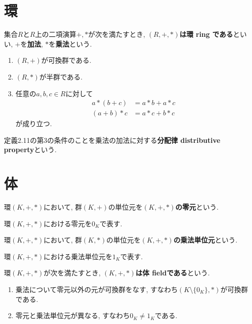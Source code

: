 \section{環}
\begin{Def}
集合$R$と$R$上の二項演算$+,*$が次を満たすとき, {\bf $(R,+,*)$は環 ring である}といい, $+$を{\bf 加法}, $*$を{\bf 乗法}という. 
\begin{enumerate}
\item $(R,+)$が可換群である.
\item $(R,*)$が半群である.
\item 任意の$a,b,c\in R$に対して
\begin{align*}
a*(b+c)&=a*b+a*c\\
(a+b)*c&=a*c+b*c
\end{align*}
が成り立つ.
\end{enumerate}
\end{Def}
\begin{caution}
定義2.11の第3の条件のことを乗法の加法に対する{\bf 分配律 distributive property}という.
\end{caution}
\section{体}
\begin{Def}
環$(K,+,*)$において,
群$(K,+)$の単位元を{\bf $(K,+,*)$の零元}という.
\end{Def}
\begin{Notation}
環$(K,+,*)$における零元を$0_K$で表す.
\end{Notation}
\begin{Def}
環$(K,+,*)$において,
群$(K,*)$の単位元を{\bf $(K,+,*)$の乗法単位元}という.
\end{Def}
\begin{Notation}
環$(K,+,*)$における乗法単位元を$1_K$で表す.
\end{Notation}

\begin{Def}
環$(K,+,*)$が次を満たすとき, {\bf $(K,+,*)$は体 fieldである}という.
\begin{enumerate}
\item 乗法について零元以外の元が可換群をなす, すなわち$(K\setminus\{0_K\},*)$が可換群である.
\item 零元と乗法単位元が異なる, すなわち$0_K\neq 1_K$である.
\end{enumerate}
\end{Def}
